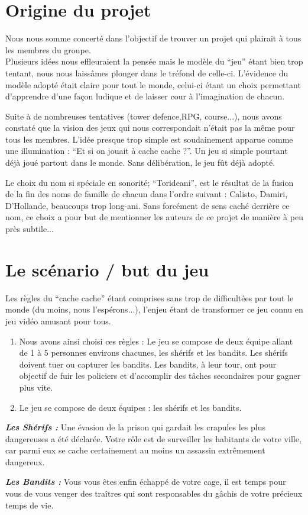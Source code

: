 \documentclass[12pt]{report}
\begin{document}
    \section{Origine du projet}
    
 Nous nous somme concerté dans l’objectif de trouver un projet qui plairait à tous les membres du groupe. \\ Plusieurs idées nous effleuraient la pensée mais le modèle du “jeu” étant bien trop tentant, nous nous laissâmes plonger dans le tréfond de celle-ci. L’évidence du modèle adopté était claire pour tout le monde, celui-ci étant un choix permettant d’apprendre d’une façon ludique et de laisser cour à l’imagination de chacun.\\ \par Suite à de nombreuses tentatives (tower defence,RPG, course...), nous avons constaté que la vision des jeux qui nous correspondait n’était pas la même pour tous les membres. L’idée presque trop simple est soudainement apparue comme une illumination : “Et si on jouait à cache cache ?”. Un jeu si simple pourtant déjà joué partout dans le monde. Sans délibération, le jeu fût déjà adopté.\\ \par Le choix du nom si spéciale en sonorité; “Torideani”, est le résultat de la fusion de la fin des noms de famille de chacun dans l'ordre suivant : Calisto, Damiri, D’Hollande, beaucoups trop long-ani. Sans forcément de sens caché derrière ce nom, ce choix a pour but de mentionner les auteurs de ce projet de manière à peu près subtile...
    \section{Le scénario / but du jeu}
    Les règles du “cache cache” étant comprises sans trop de difficultées par tout le monde (du moins, nous l'espérons...), l’enjeu étant de transformer ce jeu connu en jeu vidéo amusant pour tous. \\
        \begin{enumerate}
            \item Nous avons ainsi choisi ces règles : Le jeu se compose de deux équipe allant de 1 à 5 personnes environs chacunes, les shérifs et les bandits. Les shérifs doivent tuer ou capturer les bandits. Les bandits, à leur tour, ont pour objectif de fuir les policiers et d’accomplir des tâches secondaires pour gagner plus vite. 
            \item Le jeu se compose de deux équipes : les shérifs et les bandits. \\
        \end{enumerate}
        \par \textbf{\textit{Les Shérifs :}} Une évasion de la prison qui gardait les crapules les plus dangereuses a été déclarée. Votre rôle est de surveiller les habitants de votre ville, car parmi eux se cache certainement au moins un assassin extrêmement dangereux.\\
        \par \textbf{\textit{Les Bandits :}} Vous vous êtes enfin échappé de votre cage, il est temps pour vous de vous venger des traîtres qui sont responsables du gâchis de votre précieux temps de vie.
        
\end{document}
